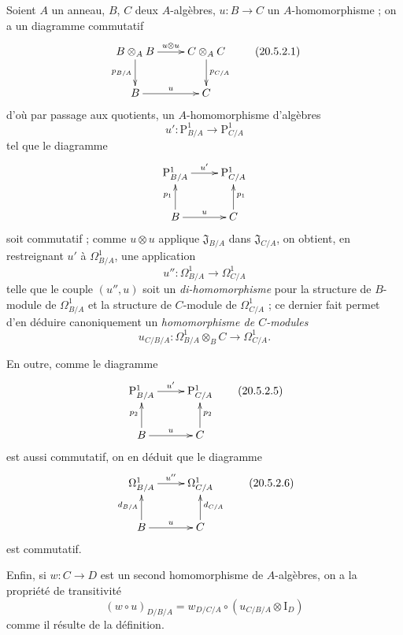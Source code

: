 \begin{env}[20.5.2]
\label{0.20.5.2-fr}
Soient $A$ un anneau, $B$, $C$ deux $A$-algèbres, $u:B\to C$ un
$A$-homomorphisme ; on a un diagramme commutatif
\[
\xymatrix{
  B\otimes_A B \ar[r]^{u\otimes u} \ar[d]_{p_{B/A}} &
  C\otimes_A C \ar[d]^{p_{C/A}} \\
  B \ar[r]^u & C
}
\tag{20.5.2.1}
\label{0.20.5.2.1-fr}
\]
d'où par passage aux quotients, un $A$-homomorphisme d'algèbres
\begin{equation}
\tag{20.5.2.2}
\label{0.20.5.2.2-fr}
  u':\mathrm{P}^1_{B/A}\to\mathrm{P}^1_{C/A}
\end{equation}
tel que le diagramme
\[
\xymatrix{
  \mathrm{P}^1_{B/A} \ar[r]^{u'} & \mathrm{P}^1_{C/A} \\
  B \ar[u]^{p_1} \ar[r]^u & C \ar[u]_{p_1}
}
\]
soit commutatif ; comme $u\otimes u$ applique $\mathfrak{J}_{B/A}$ dans
$\mathfrak{J}_{C/A}$, on obtient, en restreignant $u'$ à
$\Omega^1_{B/A}$, une application
\begin{equation}
\tag{20.5.2.3}
\label{0.20.5.2.3-fr}
  u'':\Omega^1_{B/A}\to\Omega^1_{C/A}
\end{equation}
telle que le couple $(u'',u)$ soit un \emph{di-homomorphisme} pour la
structure de $B$-module de $\Omega^1_{B/A}$ et la structure de $C$-module de
$\Omega^1_{C/A}$ ; ce dernier fait permet d'en déduire canoniquement un
\emph{homomorphisme de $C$-modules}
\begin{equation}
\tag{20.5.2.4}
\label{0.20.5.2.4-fr}
  u_{C/B/A}:\Omega^1_{B/A}\otimes_B C\to\Omega^1_{C/A}.
\end{equation}

En outre, comme le diagramme
\[
\xymatrix{
  \mathrm{P}^1_{B/A} \ar[r]^{u'} & \mathrm{P}^1_{C/A} \\
  B \ar[u]^{p_2} \ar[r]^u & C \ar[u]_{p_2}
}
\tag{20.5.2.5}
\label{0.20.5.2.5-fr}
\]
est aussi commutatif, on en déduit que le diagramme
\[
\xymatrix{
  \Omega^1_{B/A} \ar[r]^{u''} & \Omega^1_{C/A} \\
  B \ar[u]^{d_{B/A}} \ar[r]^u & C \ar[u]_{d_{C/A}}
}
\tag{20.5.2.6}
\label{0.20.5.2.6-fr}
\]
est commutatif.

Enfin, si $w:C\to D$ est un second homomorphisme de $A$-algèbres, on a la
propriété de transitivité
\begin{equation}
\tag{20.5.2.7}
\label{0.20.5.2.7-fr}
  (w\circ u)_{D/B/A}
  =w_{D/C/A}\circ(u_{C/B/A}\otimes\mathrm{I}_D)
\end{equation}
comme il résulte de la définition.
\end{env}

